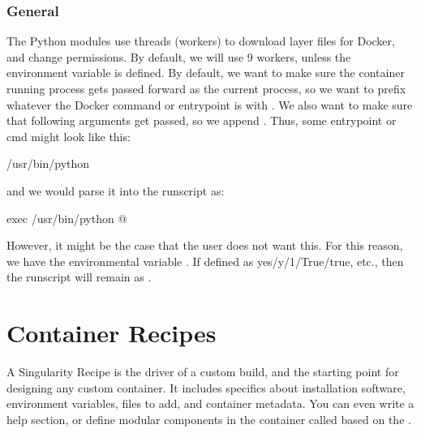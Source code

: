 \documentclass[letterpaper,10pt,english]{sphinxmanual}
\begin{document}
\subsection{General}
\label{\detokenize{build_environment:general}}
 The Python modules use threads (workers) to
download layer files for Docker, and change permissions. By default,
we will use 9 workers, unless the environment variable  is defined.
 By default, we want to make sure the container running process gets passed forward as the current process,
so we want to prefix whatever the Docker command or entrypoint is with
. We also want to make sure that following arguments get passed, so we
append . Thus, some entrypoint or cmd might look like this:

%
\begin{sphinxVerbatim}[commandchars=\\\{\}]
/usr/bin/python
\end{sphinxVerbatim}

and we would parse it into the runscript as:

%
\begin{sphinxVerbatim}[commandchars=\\\{\}]
exec /usr/bin/python \PYGZdq{}\PYGZdl{}@\PYGZdq{}
\end{sphinxVerbatim}

However, it might be the case that the user does not want this. For this
reason, we have the environmental variable . If defined as
yes/y/1/True/true, etc., then the runscript will remain as .


\chapter{Container Recipes}
\label{\detokenize{container_recipes:container-recipes}}\label{\detokenize{container_recipes:id1}}\label{\detokenize{container_recipes::doc}}\label{\detokenize{container_recipes:sec-recipefile}}
A Singularity Recipe is the driver of a custom build, and the starting
point for designing any custom container. It includes specifics about
installation software, environment variables, files to add, and container metadata. You can even write a help section, or define modular
components in the container called based on the .
\end{document}
